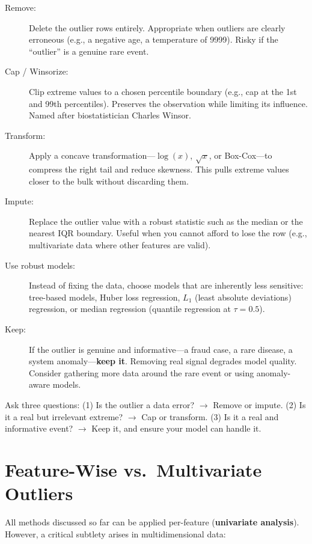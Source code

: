\begin{description}
    \item[Remove:] Delete the outlier rows entirely. Appropriate when outliers are clearly erroneous (e.g., a negative age, a temperature of 9999). Risky if the ``outlier'' is a genuine rare event.
    \item[Cap / Winsorize:] Clip extreme values to a chosen percentile boundary (e.g., cap at the 1st and 99th percentiles). Preserves the observation while limiting its influence. Named after biostatistician Charles Winsor.
    \item[Transform:] Apply a concave transformation---$\log(x)$, $\sqrt{x}$, or Box-Cox---to compress the right tail and reduce skewness. This pulls extreme values closer to the bulk without discarding them.
    \item[Impute:] Replace the outlier value with a robust statistic such as the median or the nearest IQR boundary. Useful when you cannot afford to lose the row (e.g., multivariate data where other features are valid).
    \item[Use robust models:] Instead of fixing the data, choose models that are inherently less sensitive: tree-based models, Huber loss regression, $L_1$ (least absolute deviations) regression, or median regression (quantile regression at $\tau = 0.5$).
    \item[Keep:] If the outlier is genuine and informative---a fraud case, a rare disease, a system anomaly---\textbf{keep it}. Removing real signal degrades model quality. Consider gathering more data around the rare event or using anomaly-aware models.
\end{description}

\begin{remark}
Ask three questions: (1) Is the outlier a data error? $\to$ Remove or impute. (2) Is it a real but irrelevant extreme? $\to$ Cap or transform. (3) Is it a real and informative event? $\to$ Keep it, and ensure your model can handle it.
\end{remark}


\section*{Feature-Wise vs.\ Multivariate Outliers}

All methods discussed so far can be applied per-feature (\textbf{univariate analysis}). However, a critical subtlety arises in multidimensional data:

